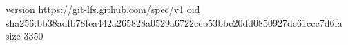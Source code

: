 version https://git-lfs.github.com/spec/v1
oid sha256:bb38adfb78fea442a265828a0529a6722ccb53bbc20dd0850927dc61ccc7d6fa
size 3350
